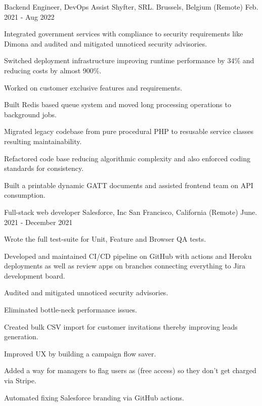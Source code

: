 \begin{cventries}
  \cventry
    {Backend Engineer, DevOps Assist} %
    {Shyfter, SRL.} %
    {Brussels, Belgium (Remote)} %
    {Feb. 2021 - Aug 2022} %
    {
      \begin{cvitems} %
        \item {Integrated government services with compliance to security requirements like Dimona and audited and mitigated unnoticed security advisories.}
        \item {Switched deployment infrastructure improving runtime performance by 34\% and reducing costs by almost 900\%.}
        \item {Worked on customer exclusive features and requirements.}
        \item {Built Redis based queue system and moved long processing operations to background jobs.}
        \item {Migrated legacy codebase from pure procedural PHP to resusable service classes resulting maintainability.}
        \item {Refactored code base reducing algorithmic complexity and also enforced coding standards for consistency.}
        \item {Built a printable dynamic GATT documents and assisted frontend team on API consumption.}
      \end{cvitems}
    }

  \cventry
    {Full-stack web developer} %
    {Salesforce, Inc} %
    {San Francisco, California (Remote)} %
    {June. 2021 - December 2021} %
    {
      \begin{cvitems} %
        \item {Wrote the full test-suite for Unit, Feature and Browser QA tests.}
        \item {Developed and maintained CI/CD pipeline on GitHub with actions and Heroku deployments as well as review apps on branches connecting everything to Jira development board.}
        \item {Audited and mitigated unnoticed security advisories.}
        \item {Eliminated bottle-neck performance issues.}
        \item {Created bulk CSV import for customer invitations thereby improving leads generation.}
        \item {Improved UX by building a campaign flow saver.}
        \item {Added a way for managers to flag users as (free access) so they don't get charged via Stripe.}
        \item {Automated fixing Salesforce branding via GitHub actions.}
      \end{cvitems}
     }


\end{cventries}
